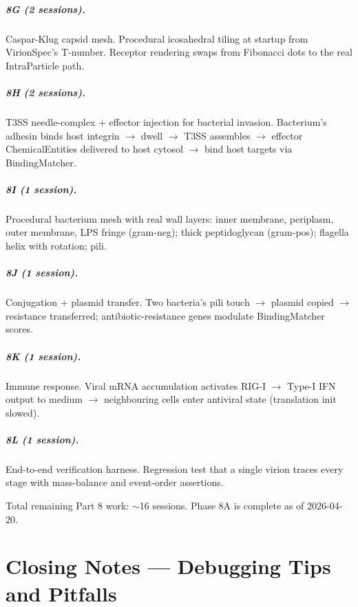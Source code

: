 \documentclass[11pt,letterpaper,twoside,openany]{book}
\begin{document}
\paragraph{8G (2 sessions).} Caspar-Klug capsid mesh. Procedural
icosahedral tiling at startup from VirionSpec's T-number. Receptor
rendering swaps from Fibonacci dots to the real IntraParticle path.

\paragraph{8H (2 sessions).} T3SS needle-complex + effector
injection for bacterial invasion. Bacterium's adhesin binds host
integrin $\to$ dwell $\to$ T3SS assembles $\to$ effector
ChemicalEntities delivered to host cytosol $\to$ bind host targets
via BindingMatcher.

\paragraph{8I (1 session).} Procedural bacterium mesh with real
wall layers: inner membrane, periplasm, outer membrane, LPS fringe
(gram-neg); thick peptidoglycan (gram-pos); flagella helix with
rotation; pili.

\paragraph{8J (1 session).} Conjugation + plasmid transfer. Two
bacteria's pili touch $\to$ plasmid copied $\to$ resistance
transferred; antibiotic-resistance genes modulate BindingMatcher
scores.

\paragraph{8K (1 session).} Immune response. Viral mRNA
accumulation activates RIG-I $\to$ Type-I IFN output to medium
$\to$ neighbouring cells enter antiviral state (translation
init slowed).

\paragraph{8L (1 session).} End-to-end verification harness.
Regression test that a single virion traces every stage with
mass-balance and event-order assertions.

Total remaining Part 8 work: $\sim$16 sessions. Phase 8A is
complete as of 2026-04-20.

\chapter{Closing Notes --- Debugging Tips and Pitfalls}
\label{ch:tips}
\end{document}
